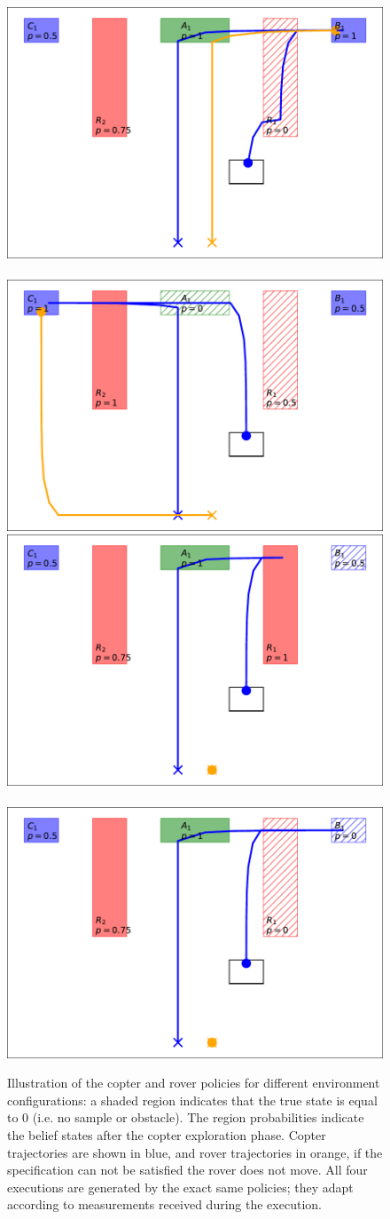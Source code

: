 \documentclass[conference]{IEEEtran}
\begin{document}
\begin{figure}
	\begin{center}
	\includegraphics[width=0.4\columnwidth]{2figs/exp0-map.pdf} ~ 
	\includegraphics[width=0.4\columnwidth]{2figs/exp1-map.pdf} \\
	\vspace{1mm} 
	\includegraphics[width=0.4\columnwidth]{2figs/exp2-map.pdf} ~ 
	\includegraphics[width=0.4\columnwidth]{2figs/exp3-map.pdf}
	\end{center}
	\caption{Illustration of the copter and rover policies for different environment configurations: a shaded region indicates that the true state is equal to 0 (i.e. no sample or obstacle). The region probabilities indicate the belief states after the copter exploration phase. Copter trajectories are shown in blue, and rover trajectories in orange, if the specification can not be satisfied the rover does not move. All four executions are generated by the exact same policies; they adapt according to measurements received during the execution.}
	\label{fig:copter_executions}
\end{figure}
\end{document}
